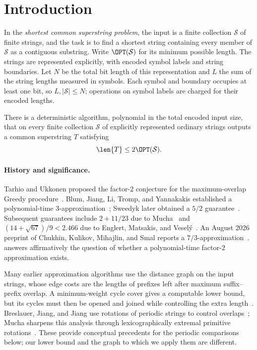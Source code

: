 \section{Introduction}\label{sec:intro}

In the \emph{shortest common superstring problem}, the input is a finite collection $\mathcal S$ of finite strings, and the task is to find a shortest string containing every member of $\mathcal S$ as a contiguous substring. Write $\OPT(\mathcal S)$ for its minimum possible length. The strings are represented explicitly, with encoded symbol labels and string boundaries. Let $N$ be the total bit length of this representation and $L$ the sum of the string lengths measured in symbols. Each symbol and boundary occupies at least one bit, so $L,|\mathcal S|\le N$; operations on symbol labels are charged for their encoded lengths.

\begin{theorem}\label{thm:main}
There is a deterministic algorithm, polynomial in the total encoded input size, that on every finite collection $\mathcal S$ of explicitly represented ordinary strings outputs a common superstring $T$ satisfying
\[
\len{T}\le 2\OPT(\mathcal S).
\]
\end{theorem}

\paragraph{History and significance.}
Tarhio and Ukkonen proposed the factor-$2$ conjecture for the maximum-overlap Greedy procedure~\cite{tarhio1988}. Blum, Jiang, Li, Tromp, and Yannakakis established a polynomial-time $3$-approximation~\cite{blum1994}; Sweedyk later obtained a $5/2$ guarantee~\cite{sweedyk1999}. Subsequent guarantees include $2+11/23$ due to Mucha~\cite{mucha2013} and $(14+\sqrt{67})/9<2.466$ due to Englert, Matsakis, and Vesel\'{y}~\cite{emv2023}. An August 2026 preprint of Chukhin, Kulikov, Mihajlin, and Smal reports a $7/3$-approximation~\cite{cycle2026}.  answers affirmatively the question of whether a polynomial-time factor-$2$ approximation exists.

Many earlier approximation algorithms use the distance graph on the input strings, whose edge costs are the lengths of prefixes left after maximum suffix--prefix overlap. A minimum-weight cycle cover gives a computable lower bound, but its cycles must then be opened and joined while controlling the extra length~\cite{blum1994}. Breslauer, Jiang, and Jiang use rotations of periodic strings to control overlaps~\cite{breslauer1997}; Mucha sharpens this analysis through lexicographically extremal primitive rotations~\cite{mucha2013}. These provide conceptual precedents for the periodic comparisons below; our lower bound and the graph to which we apply them are different.

